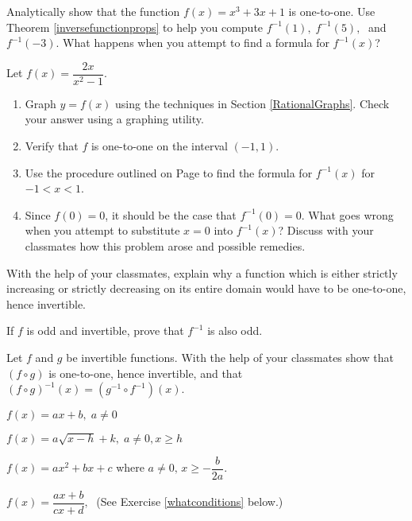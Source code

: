 \begin{exenum}
\item Analytically show that the function $f(x) = x^3 + 3x + 1$ is one-to-one.  Use Theorem \ref{inversefunctionprops} to help you compute $f^{-1}(1), \; f^{-1}(5), \;$ and $f^{-1}(-3)$.  What happens when you attempt to find a formula for $f^{-1}(x)$?


\item  Let $f(x) = \dfrac{2x}{x^2-1}$.  

\begin{enumerate}

\item  Graph $y = f(x)$ using the techniques  in Section \ref{RationalGraphs}.  Check your answer using a graphing utility.

\item Verify that $f$ is one-to-one on the interval $(-1,1)$.  

\item Use the procedure outlined on Page \pageref{inverseprocedure} to find the formula for $f^{-1}(x)$ for $-1 < x < 1$.

\item  Since $f(0) = 0$, it should be the case that $f^{-1}(0) = 0$.  What goes wrong when you attempt to substitute $x=0$ into $f^{-1}(x)$?  Discuss with your classmates how this problem arose and possible remedies.

\end{enumerate}

\item With the help of your classmates, explain why a function which is either strictly increasing or strictly decreasing on its entire domain would have to be one-to-one, hence invertible.

\item If $f$ is odd and invertible, prove that $f^{-1}$ is also odd.

\item \label{fcircginverse} Let $f$ and $g$ be invertible functions.  With the help of your classmates show that $(f \circ g)$ is one-to-one, hence invertible, and that $(f \circ g)^{-1}(x) = (g^{-1} \circ f^{-1})(x)$.


\item $f(x) = ax + b, \; a \neq 0$ \label{genericinversefirst}
\item $f(x) = a\sqrt{x - h} + k, \; a \neq 0, x \geq h$
\item $f(x) = ax^{2} + bx + c$ where $a \neq 0, \, x \geq -\dfrac{b}{2a}$.
\item $f(x) = \dfrac{ax + b}{cx + d},\;$ (See Exercise \ref{whatconditions} below.) \label{genericinverselast}


\end{exenum}
